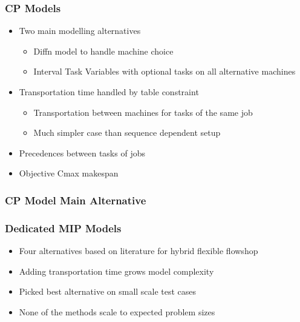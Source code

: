 \begin{frame}
\frametitle{CP Models}
\begin{itemize}
\item Two main modelling alternatives
\begin{itemize}
\item Diffn model to handle machine choice
\item Interval Task Variables with optional tasks on all alternative machines
\end{itemize}

\item Transportation time handled by table constraint
\begin{itemize}
\item Transportation between machines for tasks of the same job
\item Much simpler case than sequence dependent setup
\end{itemize}

\item Precedences between tasks of jobs

\item Objective Cmax makespan

\end{itemize}
\end{frame}

\begin{frame}
\frametitle{CP Model Main Alternative}

\end{frame}

\begin{frame}
\frametitle{Dedicated MIP Models}
\begin{itemize}
\item Four alternatives based on literature for hybrid flexible flowshop
\item Adding transportation time grows model complexity
\item Picked best alternative on small scale test cases
\item None of the methods scale to expected problem sizes
\end{itemize}
\end{frame}

